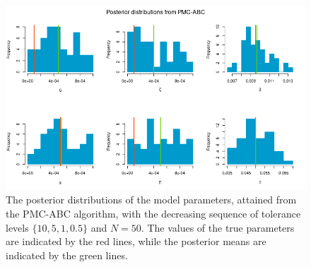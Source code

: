 \documentclass[]{article}
\begin{document}
\begin{figure}[H]
	\centering
	\includegraphics[width=1\linewidth]{../Figures/PMC_posteriors}
	\caption{The posterior distributions of the model parameters, attained from the PMC-ABC algorithm, with the decreasing sequence of tolerance levels $\{ 10, 5, 1, 0.5\}$ and $N=50$. The values of the true parameters are indicated by the red lines, while the posterior means are indicated by the green lines.}
	\label{pmc_abc_posteriors}
\end{figure}
\end{document}
